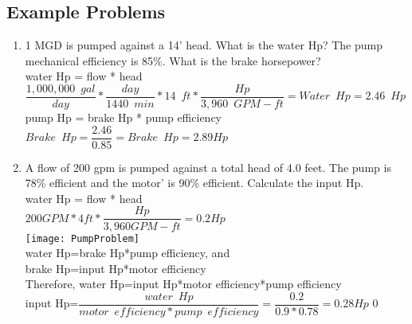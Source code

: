 \subsection{Example Problems}
\begin{enumerate}


\item 1 MGD is pumped against a 14’ head.  What is the water Hp?  The pump mechanical efficiency is 85\%.  What is the brake horsepower?\\
\vspace{0.4cm}
water Hp = flow * head\\
\vspace{0.4cm}
$\dfrac{1,000,000 \enspace gal}{day}*\dfrac{day}{1440 \enspace min}*14 \enspace ft*\dfrac{Hp}{3,960 \enspace GPM-ft}=\boxed{Water \enspace Hp = 2.46 \enspace Hp}$\\
\vspace{0.4cm}
pump Hp = brake Hp * pump efficiency\\
\vspace{0.4cm}
$Brake \enspace Hp = \dfrac{2.46}{0.85}=\boxed{Brake \enspace Hp=2.89Hp}$\\
\vspace{0.4cm}

\item A flow of 200 gpm  is pumped against a total head of 4.0 feet. The pump is 78\% efficient and the motor' is 90\% efficient. Calculate the input Hp.\\
\vspace{0.4cm}
water Hp = flow * head\\
\vspace{0.2cm}
$200GPM*4ft*\dfrac{Hp}{3,960 GPM-ft}=0.2Hp$\\
\vspace{0.4cm}\texttt{[image: PumpProblem]}\\
water Hp=brake Hp*pump efficiency, and\\
brake Hp=input Hp*motor efficiency\\
Therefore, water Hp=input Hp*motor efficiency*pump efficiency\\
\vspace{0.4cm}
input Hp=$\dfrac{water \enspace Hp}{motor \enspace efficiency*pump \enspace efficiency}=\dfrac{0.2}{0.9*0.78}=\boxed{0.28Hp}$
\vspace{0.2cm}0
\end{enumerate}


